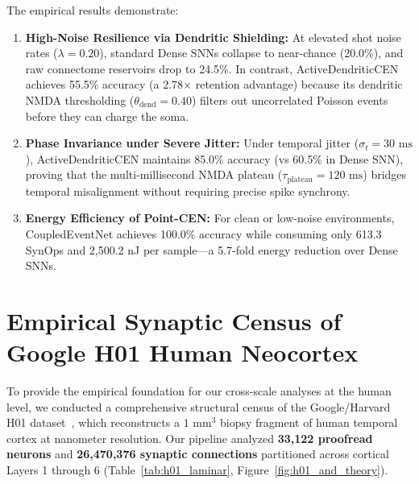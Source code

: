 \documentclass[11pt,letterpaper]{report}
\begin{document}
The empirical results demonstrate:
\begin{enumerate}[leftmargin=*]
    \item \textbf{High-Noise Resilience via Dendritic Shielding:} At elevated shot noise rates ($\lambda = 0.20$), standard Dense SNNs collapse to near-chance (20.0\%), and raw connectome reservoirs drop to 24.5\%. In contrast, ActiveDendriticCEN achieves 55.5\% accuracy (a 2.78$\times$ retention advantage) because its dendritic NMDA thresholding ($\theta_{\mathrm{dend}} = 0.40$) filters out uncorrelated Poisson events before they can charge the soma.
    \item \textbf{Phase Invariance under Severe Jitter:} Under temporal jitter ($\sigma_t = 30\text{ ms}$), ActiveDendriticCEN maintains 85.0\% accuracy (vs 60.5\% in Dense SNN), proving that the multi-millisecond NMDA plateau ($\tau_{\mathrm{plateau}} = 120\text{ ms}$) bridges temporal misalignment without requiring precise spike synchrony.
    \item \textbf{Energy Efficiency of Point-CEN:} For clean or low-noise environments, CoupledEventNet achieves 100.0\% accuracy while consuming only 613.3 SynOps and 2,500.2 nJ per sample---a 5.7-fold energy reduction over Dense SNNs.
\end{enumerate}

\section{Empirical Synaptic Census of Google H01 Human Neocortex}

To provide the empirical foundation for our cross-scale analyses at the human level, we conducted a comprehensive structural census of the Google/Harvard H01 dataset~\cite{shapsoncoe2024petavoxel}, which reconstructs a $1\text{ mm}^3$ biopsy fragment of human temporal cortex at nanometer resolution. Our pipeline analyzed \textbf{33,122 proofread neurons} and \textbf{26,470,376 synaptic connections} partitioned across cortical Layers 1 through 6 (Table~\ref{tab:h01_laminar}, Figure~\ref{fig:h01_and_theory}).
\end{document}
